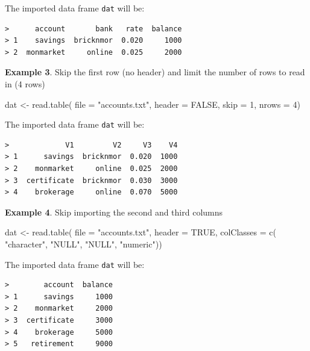 \documentclass[
]{book}
\newenvironment{Shaded}{\begin{snugshade}}{\end{snugshade}}
\newcommand{\AttributeTok}[1]{\textcolor[rgb]{0.77,0.63,0.00}{#1}}
\newcommand{\ConstantTok}[1]{\textcolor[rgb]{0.00,0.00,0.00}{#1}}
\newcommand{\DecValTok}[1]{\textcolor[rgb]{0.00,0.00,0.81}{#1}}
\newcommand{\FunctionTok}[1]{\textcolor[rgb]{0.00,0.00,0.00}{#1}}
\newcommand{\NormalTok}[1]{#1}
\newcommand{\OtherTok}[1]{\textcolor[rgb]{0.56,0.35,0.01}{#1}}
\newcommand{\StringTok}[1]{\textcolor[rgb]{0.31,0.60,0.02}{#1}}
\begin{document}
The imported data frame \texttt{dat} will be:

\begin{verbatim}
>      account       bank   rate  balance
> 1    savings  bricknmor  0.020     1000
> 2  monmarket     online  0.025     2000
\end{verbatim}

\textbf{Example 3}. Skip the first row (no header) and limit the number of rows to
read in (4 rows)

\begin{Shaded}
\begin{Highlighting}[]
\NormalTok{dat }\OtherTok{\textless{}{-}} \FunctionTok{read.table}\NormalTok{(}
  \AttributeTok{file =} \StringTok{"accounts.txt"}\NormalTok{, }
  \AttributeTok{header =} \ConstantTok{FALSE}\NormalTok{,}
  \AttributeTok{skip =} \DecValTok{1}\NormalTok{,}
  \AttributeTok{nrows =} \DecValTok{4}\NormalTok{)}
\end{Highlighting}
\end{Shaded}

The imported data frame \texttt{dat} will be:

\begin{verbatim}
>             V1         V2     V3    V4
> 1      savings  bricknmor  0.020  1000
> 2    monmarket     online  0.025  2000
> 3  certificate  bricknmor  0.030  3000
> 4    brokerage     online  0.070  5000
\end{verbatim}

\textbf{Example 4}. Skip importing the second and third columns

\begin{Shaded}
\begin{Highlighting}[]
\NormalTok{dat }\OtherTok{\textless{}{-}} \FunctionTok{read.table}\NormalTok{(}
  \AttributeTok{file =} \StringTok{"accounts.txt"}\NormalTok{, }
  \AttributeTok{header =} \ConstantTok{TRUE}\NormalTok{, }
  \AttributeTok{colClasses =} \FunctionTok{c}\NormalTok{(}
    \StringTok{"character"}\NormalTok{,}
    \StringTok{"NULL"}\NormalTok{,}
    \StringTok{"NULL"}\NormalTok{,}
    \StringTok{"numeric"}\NormalTok{))}
\end{Highlighting}
\end{Shaded}

The imported data frame \texttt{dat} will be:

\begin{verbatim}
>        account  balance
> 1      savings     1000
> 2    monmarket     2000
> 3  certificate     3000
> 4    brokerage     5000
> 5   retirement     9000
\end{verbatim}
\end{document}
